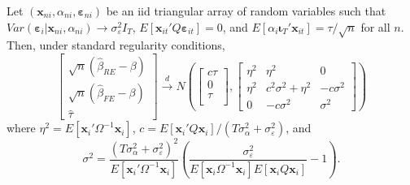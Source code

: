 \begin{thm}
\label{thm:REvsFE}
  Let $\left( \mathbf{x}_{ni}, \alpha_{ni}, \boldsymbol{\varepsilon}_{ni} \right)$ be an iid triangular array of random variables such that $Var(\boldsymbol{\varepsilon}_i|\mathbf{x}_{ni},\alpha_{ni})\rightarrow \sigma_{\varepsilon}^2 I_T$, $E[\mathbf{x}_{it}'Q\boldsymbol{\varepsilon}_{it}]=0$, and $E\left[ \alpha_i \boldsymbol{\iota}_T'\mathbf{x}_{it} \right]=\tau/\sqrt{n}$ for all $n$.
  Then, under standard regularity conditions,
\[
  \left[\begin{array}{c}
\sqrt{n} (\widehat{\beta}_{RE} - \beta)\\
\sqrt{n} (\widehat{\beta}_{FE} - \beta)\\
\widehat{\tau}
\end{array}\right] \overset{d}{\rightarrow} N \left( 
\left[\begin{array}{c}
c\tau \\
0  \\
\tau\\
\end{array}\right],  
\left[\begin{array}{ccc}
\eta^2 & \eta^2 & 0 \\
\eta^2 & c^2\sigma^2 + \eta^2 & -c\sigma^2\\ 
0 & -c\sigma^2 & \sigma^2
\end{array}\right] \right)
\]
where $\eta^2 = E[\mathbf{x}_i'\Omega^{-1}\mathbf{x}_i]$, $c = E[\mathbf{x}_i' Q \mathbf{x}_i]/(T\sigma_\alpha^2 + \sigma_\varepsilon^2)$, and
\[\sigma^2 = \frac{(T\sigma_{\alpha}^2 + \sigma_{\varepsilon}^2)^2}{E\left[ \mathbf{x}_i'\Omega^{-1}\mathbf{x}_i \right]}\left( \frac{\sigma_{\varepsilon}^2}{E\left[ \mathbf{x}_i \Omega^{-1} \mathbf{x}_i \right]E\left[ \mathbf{x}_i Q \mathbf{x}_i \right]} - 1 \right). \]
\end{thm}



